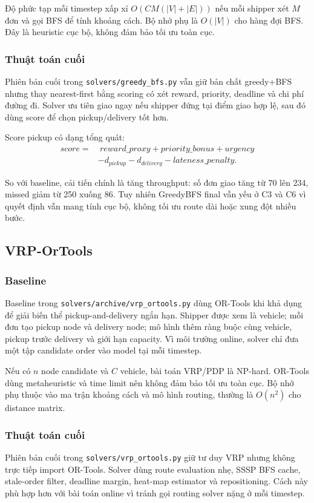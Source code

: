 \documentclass[conference]{IEEEtran}
\newcommand{\code}[1]{\texttt{#1}}
\begin{document}
Độ phức tạp mỗi timestep xấp xỉ $O(CM(|V|+|E|))$ nếu mỗi shipper xét $M$ đơn và gọi BFS để tính khoảng cách. Bộ nhớ phụ là $O(|V|)$ cho hàng đợi BFS. Đây là heuristic cục bộ, không đảm bảo tối ưu toàn cục.

\subsubsection{Thuật toán cuối}
Phiên bản cuối trong \code{solvers/greedy\_bfs.py} vẫn giữ bản chất greedy+BFS nhưng thay nearest-first bằng scoring có xét reward, priority, deadline và chi phí đường đi. Solver ưu tiên giao ngay nếu shipper đứng tại điểm giao hợp lệ, sau đó dùng score để chọn pickup/delivery tốt hơn.

Score pickup có dạng tổng quát:
\begin{equation}
\begin{split}
score =&~ reward\_proxy + priority\_bonus + urgency\\
&- d_{pickup} - d_{delivery} - lateness\_penalty.
\end{split}
\end{equation}

So với baseline, cải tiến chính là tăng throughput: số đơn giao tăng từ 70 lên 234, missed giảm từ 250 xuống 86. Tuy nhiên GreedyBFS final vẫn yếu ở C3 và C6 vì quyết định vẫn mang tính cục bộ, không tối ưu route dài hoặc xung đột nhiều bước.

\subsection{VRP-OrTools}
\subsubsection{Baseline}
Baseline trong \code{solvers/archive/vrp\_ortools.py} dùng OR-Tools khi khả dụng để giải biến thể pickup-and-delivery ngắn hạn. Shipper được xem là vehicle; mỗi đơn tạo pickup node và delivery node; mô hình thêm ràng buộc cùng vehicle, pickup trước delivery và giới hạn capacity. Vì môi trường online, solver chỉ đưa một tập candidate order vào model tại mỗi timestep.

Nếu có $n$ node candidate và $C$ vehicle, bài toán VRP/PDP là NP-hard. OR-Tools dùng metaheuristic và time limit nên không đảm bảo tối ưu toàn cục. Bộ nhớ phụ thuộc vào ma trận khoảng cách và mô hình routing, thường là $O(n^2)$ cho distance matrix.

\subsubsection{Thuật toán cuối}
Phiên bản cuối trong \code{solvers/vrp\_ortools.py} giữ tư duy VRP nhưng không trực tiếp import OR-Tools. Solver dùng route evaluation nhẹ, SSSP BFS cache, stale-order filter, deadline margin, heat-map estimator và repositioning. Cách này phù hợp hơn với bài toán online vì tránh gọi routing solver nặng ở mỗi timestep.
\end{document}
